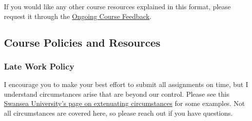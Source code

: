 \documentclass[
  letterpaper,
  DIV=11,
  numbers=noendperiod]{scrartcl}
\begin{document}
If you would like any other course resources explained in this format,
please request it through the
\href{https://forms.office.com/Pages/ResponsePage.aspx?id=V3lz4rj6fk2U9pvWr59xWFMopmPUjRtDiHLswhgacNhURDc2S1dGNTlTRVJVUFoyQUUzNFJMS0JXUi4u}{Ongoing
Course Feedback}.~

\subsection{Course Policies and
Resources}\label{course-policies-and-resources}

\subsubsection{Late Work Policy}\label{late-work-policy}

I encourage you to make your best effort to submit all assignments on
time, but I understand circumstances arise that are beyond our control.
Please see this
\href{https://myuni.swansea.ac.uk/academic-life/extenuating-circumstances/\#how-can-the-university-support-me-and-what-should-i-do=is-expanded&what-are-extenuating-circumstances=is-expanded&what-isnt-an-extenuating-circumstance=is-expanded&what-supporting-evidence-is-required=is-expanded&who-should-i-contact-to-make-an-extenuating-circumstances-application=is-expanded&who-will-make-a-decision-on-my-application=is-expanded}{Swansea
University's page on extenuating circumstances} for some examples. Not
all circumstances are covered here, so please reach out if you have
questions.~
\end{document}
